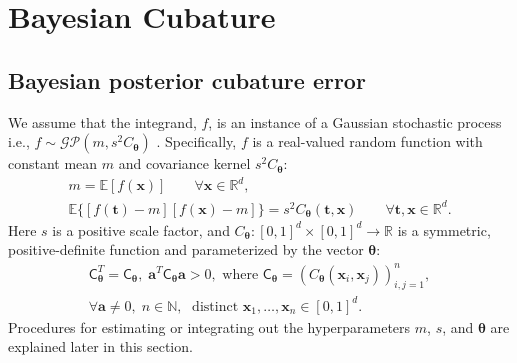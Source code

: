 \documentclass[twocolumn]{svjour3}          %
\newcommand{\bm}[1]{\boldsymbol{#1}}
\newcommand{\reals}{\mathbb{R}}
\newcommand{\Ex}{\mathbb{E}}
\newcommand{\vtheta}{{\bm{\theta}}}
\newcommand{\va}{\bm{a}}
\newcommand{\vt}{\bm{t}}
\newcommand{\vx}{\bm{x}}
\newcommand{\mC}{\mathsf{C}}
\begin{document}
\section{Bayesian Cubature} \label{sec:BC} 


\subsection{Bayesian posterior cubature error}
\label{sec:BayesPostErr}

We assume that the integrand, $f$, is an instance of a Gaussian stochastic process  i.e., $f \sim \mathcal{GP}(m,s^2 C_\vtheta)$  \cite{BriEtal18a,Dia88a,OHa91a,Rit00a,RasGha03a}.  Specifically, $f$ is a real-valued random function with constant mean $m$ and covariance kernel $s^2C_\vtheta$:
\begin{gather*}
        m = \Ex[f(\vx)] \qquad \forall \vx \in \reals^d, \\
        \Ex\{[f(\vt) - m][f(\vx) -m]\} = s^2 C_\vtheta(\vt,\vx) \qquad \forall \vt, \vx \in \reals^d.
\end{gather*}
Here $s$ is a positive scale factor, and $C_\vtheta: [0,1]^d \times [0,1]^d \to \mathbb{R} $ is a symmetric, positive-definite function and parameterized by the vector $\vtheta$:
\begin{multline} \label{FJH:eq:CondPosDef}
\mC_\vtheta^T = \mC_\vtheta,  \; \va^T \mC_\vtheta \va > 0,  \text{ where }  \mC_\vtheta = \left(  C_\vtheta(\vx_i,\vx_j)  \right)_{i,j=1}^n,\\
 \forall \va \ne 0, \;
 n\in \mathbb{N}, \; \text{ distinct }\vx_1, \ldots, \vx_n \in [0,1]^d.
\end{multline}
Procedures for estimating or integrating out the hyperparameters $m$, $s$, and $\vtheta$ are explained later in this section.
\end{document}
